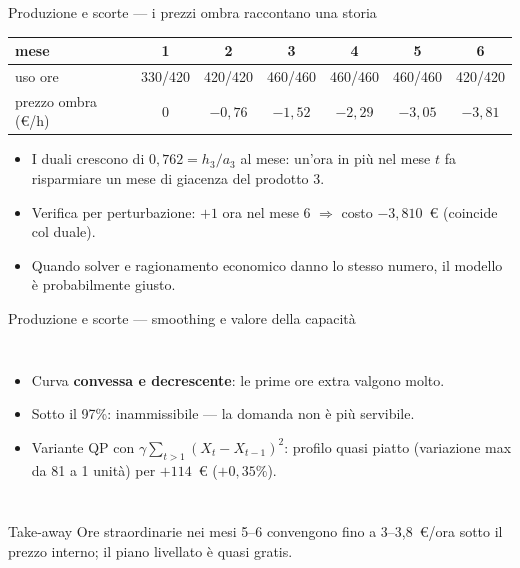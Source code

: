 \documentclass[11pt,aspectratio=169]{beamer}
\begin{document}
\begin{frame}{Produzione e scorte --- i prezzi ombra raccontano una storia}
\begin{center}\small
\begin{tabular}{lcccccc}
\toprule
mese & 1 & 2 & 3 & 4 & 5 & 6\\
\midrule
uso ore & 330/420 & 420/420 & 460/460 & 460/460 & 460/460 & 420/420 \\
prezzo ombra (\euro/h) & 0 & $-0{,}76$ & $-1{,}52$ & $-2{,}29$ & $-3{,}05$ & $-3{,}81$ \\
\bottomrule
\end{tabular}
\end{center}
\begin{itemize}
  \item I duali crescono di $0{,}762 = h_3/a_3$ al mese: un'ora in più nel mese $t$
        fa risparmiare \alert{un mese di giacenza} del prodotto 3.
  \item Verifica per perturbazione: $+1$ ora nel mese 6 $\Rightarrow$ costo
        $-3{,}810$~\euro{} (coincide col duale).
  \item Quando solver e ragionamento economico danno lo stesso numero, il modello è
        probabilmente giusto.
\end{itemize}
\end{frame}

\begin{frame}{Produzione e scorte --- smoothing e valore della capacità}
\begin{columns}
\small
\begin{itemize}
  \item Curva \textbf{convessa e decrescente}: le prime ore extra valgono molto.
  \item Sotto il 97\%: \alert{inammissibile} --- la domanda non è più servibile.
  \item Variante QP con $\gamma \sum_{t>1} (X_t - X_{t-1})^2$: profilo quasi piatto
        (variazione max da 81 a 1 unità) per $+114$~\euro{} ($+0{,}35\%$).
\end{itemize}
\end{columns}
\begin{block}{Take-away}
Ore straordinarie nei mesi 5--6 convengono fino a 3--3,8~\euro/ora sotto il prezzo
interno; il piano livellato è quasi gratis.
\end{block}
\end{frame}
\end{document}
